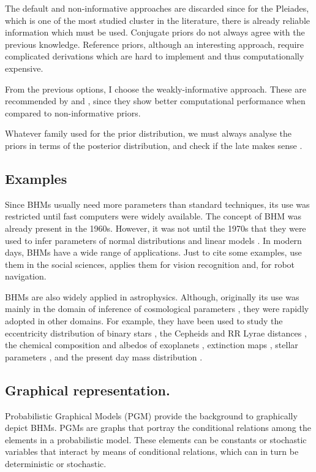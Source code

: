 The default and non-informative approaches are discarded since for the Pleiades, which is one of the most studied cluster in the literature, there is already reliable information which must be used.  Conjugate priors do not always agree with the previous knowledge. Reference priors, although an interesting approach, require complicated derivations which are hard to implement and thus computationally expensive. 

From the previous options, I choose the weakly-informative approach. These are recommended by \citet{Gelman2006,Gelman2008,Huang2013} and \citet{Chung2015}, since they show better computational performance when compared to non-informative priors.

Whatever family used for the prior distribution, we must always analyse the priors in terms of the posterior distribution, and check if the late makes sense \cite[][ Chap. 6]{Gelman2006,Gelman2013}.


\subsection{Examples}
Since BHMs usually need more parameters than standard techniques, its use was restricted until fast computers were widely available. The concept of BHM was already present in the 1960s. However, it was not until  the 1970s that they were used to infer parameters of normal distributions and linear models \cite[see][for an historical perspective of BHMs]{Good1980}. In modern days, BHMs have a wide range of applications. Just to cite some examples, \citet{Gelman2007} use them in the social sciences, \citet{Fei2005} applies them for vision recognition and, \citet{Diard2008} for robot navigation.

BHMs are also widely applied in astrophysics. Although, originally its use was mainly in the domain of inference of cosmological parameters \cite[see for example the works of][]{Feeney2013,March2014,Anderes2015,Shariff2016,Alsing2017}, they were rapidly adopted in other domains. For example, they have been used to study the eccentricity distribution of binary stars \citet{Hogg2010}, the Cepheids \citep{Barnes2004} and RR Lyrae distances \citep{Jefferys2007}, the chemical composition \citep{Wolfgang2015} and albedos of exoplanets \citep{Demory2014}, extinction maps \citep{Sale2012}, stellar parameters \citep{Shkedy2007}, and the present day mass distribution \citep{Tapiador2017}.

\subsection{Graphical representation.}
\label{sect:PGM}
Probabilistic Graphical Models (PGM) provide the background to graphically depict BHMs. PGMs are graphs that portray the conditional relations among the elements in a probabilistic model. These elements can be constants or stochastic variables that interact by means of conditional relations, which can in turn be deterministic or stochastic. 

